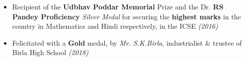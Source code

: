 \documentclass{article}
\newcommand{\xfilll}[2][1ex]{
\dimen0=#2\advance\dimen0 by #1
\leaders\hrule height \dimen0 depth -#1\hfill}
\begin{document}
\begin{itemize}[itemsep = -0.75 mm, leftmargin=*]
\item  Recipient of the {\bf Udbhav Poddar Memorial} Prize and the Dr. {\bf RS Pandey Proficiency} {\it Silver Medal} for securing the \textbf{highest marks} in the country in Mathematics and Hindi respectively, in the ICSE \hfill{\sl \small (2016)}
\item Felicitated with a {\bf Gold} medal, by {\it Mr. S.K.Birla}, industrialist \& trustee of Birla High School \hfill{\sl \small (2018)} 
\end{itemize}




\vspace{-18.5pt}
\end{document}

